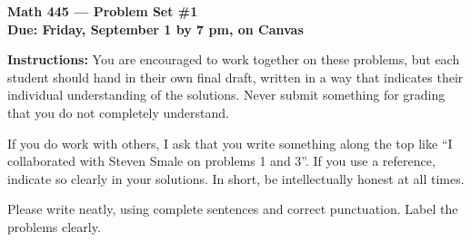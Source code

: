 \documentclass{amsart}
\begin{document}
\begin{center}
{\large\bfseries
Math 445 --- Problem Set \#1 \\
Due: Friday, September 1 by 7 pm, on Canvas}
\end{center}





{\bf Instructions:} You are encouraged to work together on these
problems, but each student should hand in their own final draft,
written in a way that indicates their individual understanding of
the solutions. Never submit something for grading
that you do not completely understand. 

If you do work with others, I ask that you write something along the
top like ``I collaborated with Steven Smale on problems 1 and 3''.
If you use a reference, indicate so clearly in your solutions. 
In short, be intellectually
honest at all times.

Please write neatly, using complete sentences and correct
punctuation. Label the problems clearly. 
\end{document}
